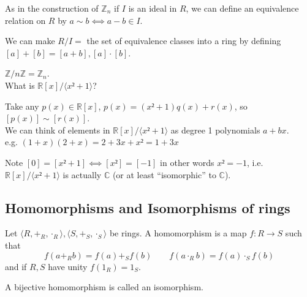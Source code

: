\documentclass[english]{lbscript}
\begin{document}
As in the construction of \(ℤ_{n}\) if \(I \) is an ideal in \(R\), we can define an equivalence relation on \(R\) by \(a\sim b ⟺ a-b∈I\).

We can make \(R/I=\) the set of equivalence classes into a ring by defining \([a]+[b]=[a+b], [a]⋅[b]\).

\begin{example}{}{}
	\(ℤ / nℤ = ℤ_{n}\).\\

	What is \(ℝ[x] / ⟨x²+1⟩\)?

	Take any \(p(x)∈ℝ[x]\), \(p(x)=(x²+1)q(x) + r(x)\), so \([p(x)]\sim [r(x)]\).\\
	We can think of elements in \(ℝ[x] / ⟨x²+1⟩\) as degree 1 polynomials \(a+bx\).\\
	e.g. \((1+x)(2+x)=2+3x+x²=1+3x\)

	Note \([0]=[x²+1]⟺[x²]=[-1]\) in other words \(x²=-1\), i.e. \(ℝ[x] / ⟨x²+1⟩\) is actually \(ℂ\) (or at least \enquote{isomorphic} to \(ℂ\)).
\end{example}


\subsection{Homomorphisms and Isomorphisms of rings}
\label{sec:homom-isom-rings}

Let \(⟨R,+_{R},⋅_{R}⟩, ⟨S,+_{S}, ⋅_{S} ⟩\) be rings. A homomorphism is a map \(f:R→S\) such that
\begin{equation}
	\label{eq:108}
	f(a+_{R}b) = f(a) +_{S} f(b)\quad \quad f(a⋅_{R}b)=f(a)⋅_{S}f(b)
\end{equation}
and if \(R,S\) have unity \(f(1_{R})=1_{S}\).

A bijective homomorphism is called an isomorphism.
\end{document}
